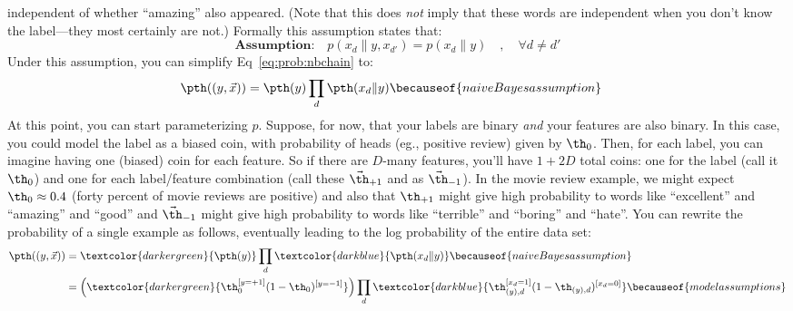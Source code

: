 independent of whether ``amazing'' also appeared.  (Note that this
does \emph{not} imply that these words are independent when you don't
know the label---they most certainly are not.)  Formally this
assumption states that:
%
\begin{equation} \label{eq:prob:nbassumption}
\textbf{Assumption:}\quad
  p(x_d \| y, x_{d'}) = p(x_d \| y) \quad,\quad \forall d \neq d'
\end{equation}
%
Under this assumption, you can simplify Eq~\eqref{eq:prob:nbchain} to:
%
\begin{align} \label{eq:prob:nb}
  \pth( (y, \vec x) )
&= \pth(y) \prod_d \pth(x_d \| y) 
\becauseof{naive Bayes assumption}
\end{align}
%
At this point, you can start parameterizing $p$.  Suppose, for now,
that your labels are binary \emph{and} your features are also binary.
In this case, you could model the label as a biased coin, with
probability of heads (eg., positive review) given by $\th_0$.  Then,
for each label, you can imagine having one (biased) coin for each
feature.  So if there are $D$-many features, you'll have $1+2D$ total
coins: one for the label (call it $\th_0$) and one for each
label/feature combination (call these $\vec\th_{+1}$ and as
$\vec\th_{-1}$).  In the movie review example, we might expect $\th_0
\approx 0.4$ (forty percent of movie reviews are positive) and also
that $\th_{+1}$ might give high probability to words like
``excellent'' and ``amazing'' and ``good'' and $\vec\th_{-1}$ might
give high probability to words like ``terrible'' and ``boring'' and
``hate''.  You can rewrite the probability of a single example as
follows, eventually leading to the log probability of the entire data
set:
%
\begin{align} \label{eq:prob:nbmult}
  \pth( (y, \vec x) )
&= \textcolor{darkergreen}{\pth(y)} \prod_d \textcolor{darkblue}{\pth(x_d \| y)}
\becauseof{naive Bayes assumption}\\
&= \left( \textcolor{darkergreen}{
      \th_0^{[y=+1]} (1-\th_0)^{[y=-1]}
    }\right)
  \prod_d
   \textcolor{darkblue}{
       \th_{(y),d}^{[x_d=1]}
       (1-\th_{(y),d})^{[x_d=0]}
       } \becauseof{model assumptions}
\end{align}

